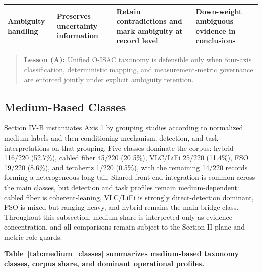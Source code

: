 \documentclass[letterpaper,journal]{IEEEtran}
\begin{document}
\begin{table}[!t]
\begin{tabularx}{\textwidth}{@{}>{\raggedright\arraybackslash}p{2.15cm} >{\raggedright\arraybackslash}X >{\raggedright\arraybackslash}X >{\raggedright\arraybackslash}X@{}}
        Ambiguity handling                                                                                        &
        Preserves uncertainty information                                                                         &
        Retain contradictions and mark ambiguity at record level                                                  &
        Down-weight ambiguous evidence in conclusions                                                               \\
        \bottomrule
    \end{tabularx}
\end{table}

\begin{quote}
    \textbf{Lesson (A):} Unified O-ISAC taxonomy is defensible only when four-axis classification, deterministic mapping, and measurement-metric governance are enforced jointly under explicit ambiguity retention.
\end{quote}

\subsection{Medium-Based Classes}
Section IV-B instantiates Axis 1 by grouping studies according to normalized medium labels and then conditioning mechanism, detection, and task interpretations on that grouping. Five classes dominate the corpus: hybrid 116/220 (52.7\%), cabled fiber 45/220 (20.5\%), VLC/LiFi 25/220 (11.4\%), FSO 19/220 (8.6\%), and terahertz 1/220 (0.5\%), with the remaining 14/220 records forming a heterogeneous long tail. Shared front-end integration is common across the main classes, but detection and task profiles remain medium-dependent: cabled fiber is coherent-leaning, VLC/LiFi is strongly direct-detection dominant, FSO is mixed but ranging-heavy, and hybrid remains the main bridge class. Throughout this subsection, medium share is interpreted only as evidence concentration, and all comparisons remain subject to the Section II plane and metric-role guards.

\textbf{Table~\ref{tab:medium_classes} summarizes medium-based taxonomy classes, corpus share, and dominant operational profiles.}
\end{document}
